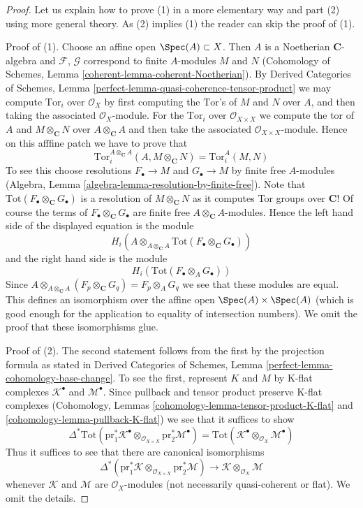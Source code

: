\begin{proof}
Let us explain how to prove (1) in a more elementary way and part (2) using
more general theory. As (2) implies (1) the reader can skip the proof
of (1).

\medskip\noindent
Proof of (1). Choose an affine open $\Spec(A) \subset X$.
Then $A$ is a Noetherian $\mathbf{C}$-algebra and
$\mathcal{F}$, $\mathcal{G}$ correspond to finite $A$-modules
$M$ and $N$ (Cohomology of Schemes, Lemma
\ref{coherent-lemma-coherent-Noetherian}).
By Derived Categories of Schemes, Lemma
\ref{perfect-lemma-quasi-coherence-tensor-product} we may
compute $\text{Tor}_i$ over $\mathcal{O}_X$
by first computing the $\text{Tor}$'s
of $M$ and $N$ over $A$, and then taking the associated $\mathcal{O}_X$-module.
For the $\text{Tor}_i$ over $\mathcal{O}_{X \times X}$ we compute
the tor of $A$ and $M \otimes_\mathbf{C} N$ over $A \otimes_\mathbf{C} A$
and then take the associated $\mathcal{O}_{X \times X}$-module.
Hence on this afffine patch we have to prove that
$$
\text{Tor}_i^{A \otimes_\mathbf{C} A}(A, M \otimes_\mathbf{C} N) =
\text{Tor}_i^A(M, N)
$$
To see this choose resolutions $F_\bullet \to M$ and $G_\bullet \to M$
by finite free $A$-modules
(Algebra, Lemma \ref{algebra-lemma-resolution-by-finite-free}).
Note that $\text{Tot}(F_\bullet \otimes_\mathbf{C} G_\bullet)$
is a resolution of $M \otimes_\mathbf{C} N$ as it computes
Tor groups over $\mathbf{C}$! Of course the terms of
$F_\bullet \otimes_\mathbf{C} G_\bullet$ are finite free
$A \otimes_\mathbf{C} A$-modules. Hence the left hand side
of the displayed equation is the module
$$
H_i(A \otimes_{A \otimes_\mathbf{C} A}
\text{Tot}(F_\bullet \otimes_\mathbf{C} G_\bullet))
$$
and the right hand side is the module
$$
H_i(\text{Tot}(F_\bullet \otimes_A G_\bullet))
$$
Since $A \otimes_{A \otimes_\mathbf{C} A} (F_p \otimes_\mathbf{C} G_q)
= F_p \otimes_A G_q$ we see that these modules are equal.
This defines an isomorphism over the affine open $\Spec(A) \times \Spec(A)$
(which is good enough for the application to equality of intersection numbers).
We omit the proof that these isomorphisms glue.

\medskip\noindent
Proof of (2). The second statement follows from the first by the
projection formula as stated in
Derived Categories of Schemes, Lemma \ref{perfect-lemma-cohomology-base-change}.
To see the first, represent $K$ and $M$ by K-flat complexes
$\mathcal{K}^\bullet$ and $\mathcal{M}^\bullet$.
Since pullback and tensor product preserve K-flat complexes
(Cohomology, Lemmas \ref{cohomology-lemma-tensor-product-K-flat} and
\ref{cohomology-lemma-pullback-K-flat})
we see that it suffices to show
$$
\Delta^*\text{Tot}(
\text{pr}_1^*\mathcal{K}^\bullet
\otimes_{\mathcal{O}_{X \times X}} \text{pr}_2^*\mathcal{M}^\bullet)
=
\text{Tot}(
\mathcal{K}^\bullet \otimes_{\mathcal{O}_X} \mathcal{M}^\bullet)
$$
Thus it suffices to see that there are canonical isomorphisms
$$
\Delta^*(\text{pr}_1^*\mathcal{K}
\otimes_{\mathcal{O}_{X \times X}} \text{pr}_2^*\mathcal{M})
\longrightarrow
\mathcal{K} \otimes_{\mathcal{O}_X} \mathcal{M}
$$
whenever $\mathcal{K}$ and $\mathcal{M}$ are $\mathcal{O}_X$-modules
(not necessarily quasi-coherent or flat).
We omit the details.
\end{proof}


